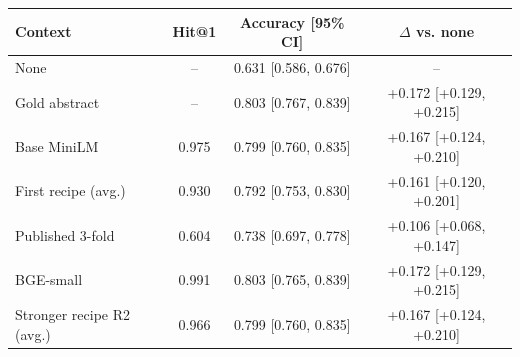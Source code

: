 \begin{tabular}{lccc}
\toprule
Context & Hit@1 & Accuracy [95\% CI] & $\Delta$ vs. none \\
\midrule
None & -- & 0.631 [0.586, 0.676] & -- \\
Gold abstract & -- & 0.803 [0.767, 0.839] & +0.172 [+0.129, +0.215] \\
Base MiniLM & 0.975 & 0.799 [0.760, 0.835] & +0.167 [+0.124, +0.210] \\
First recipe (avg.) & 0.930 & 0.792 [0.753, 0.830] & +0.161 [+0.120, +0.201] \\
Published 3-fold & 0.604 & 0.738 [0.697, 0.778] & +0.106 [+0.068, +0.147] \\
BGE-small & 0.991 & 0.803 [0.765, 0.839] & +0.172 [+0.129, +0.215] \\
Stronger recipe R2 (avg.) & 0.966 & 0.799 [0.760, 0.835] & +0.167 [+0.124, +0.210] \\
\bottomrule
\end{tabular}
